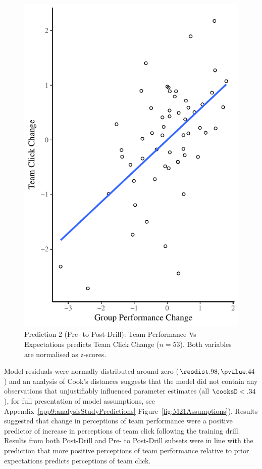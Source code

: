 \begin{CJK}{UTF8}{gbsn}
 \begin{figure}
     \centering
     \includegraphics[width=0.5\linewidth,keepaspectratio] {images/groupPerfClickChangeCondition}
     \caption{Prediction 2 (Pre- to Post-Drill): Team Performance Vs Expectations predicts Team Click Change ($n = 53$).  Both variables are normalised as z-scores.}
     \label{fig:groupPerfClickChangeCondition}
 \end{figure}

Model residuals were normally distributed around zero ($\resdist .98, \pvalue .44$) and an analysis of Cook's distances suggests that the model did not contain any observations that unjustifiably influenced parameter estimates (all $\cooksD < .34$), for full presentation of model assumptions, see Appendix~\ref{app9:analysisStudyPredictions} Figure~\ref{fig:M21Assumptions}).  Results suggested that change in perceptions of team performance were a positive predictor of increase in perceptions of team click following the training drill.  Results from both Post-Drill and Pre- to Post-Drill subsets were in line with the prediction that more positive perceptions of team performance relative to prior expectations predicts perceptions of team click.





\end{CJK}
